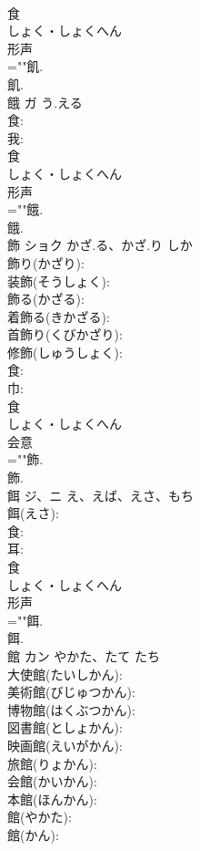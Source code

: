 \documentclass[8pt]{extreport}
\begin{document}
\begin{CJK}{UTF8}{min}
\\	食	
\\	しょく・しょくへん	
\\	形声 
\\	=""飢.
\\	飢.
\\	餓	ガ	う.える		
\\	食: 
\\	我: 
\\	食	
\\	しょく・しょくへん	
\\	形声 
\\	=""餓.
\\	餓.
\\	飾	ショク	かざ.る、かざ.り	しか	
\\	飾り(かざり): 
\\	装飾(そうしょく): 
\\	飾る(かざる): 
\\	着飾る(きかざる): 
\\	首飾り(くびかざり): 
\\	修飾(しゅうしょく): 
\\	食: 
\\	巾: 
\\	食	
\\	しょく・しょくへん	
\\	会意 
\\	=""飾.
\\	飾.
\\	餌	ジ、ニ	え、えば、えさ、もち		
\\	餌(えさ): 
\\	食: 
\\	耳: 
\\	食	
\\	しょく・しょくへん	
\\	形声 
\\	=""餌.
\\	餌.
\\	館	カン	やかた、たて	たち	
\\	大使館(たいしかん): 
\\	美術館(びじゅつかん): 
\\	博物館(はくぶつかん): 
\\	図書館(としょかん): 
\\	映画館(えいがかん): 
\\	旅館(りょかん): 
\\	会館(かいかん): 
\\	本館(ほんかん): 
\\	館(やかた): 
\\	館(かん): 

\end{CJK}
\end{document}
